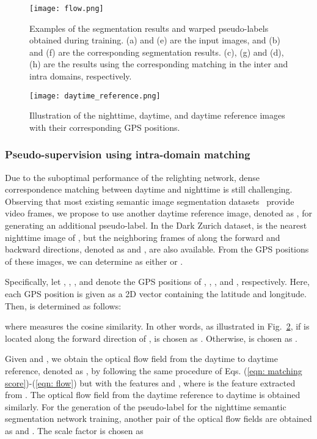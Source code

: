 \documentclass[10pt,twocolumn,letterpaper]{article}
\begin{document}
\begin{figure}[t]
  \centering
  \texttt{[image: flow.png]}
  \caption{Examples of the segmentation results and warped pseudo-labels obtained during training. (a) and (e) are the input images, and (b) and (f) are the corresponding segmentation results. 
(c), (g) and (d), (h) are the results using the corresponding matching in the inter and intra domains, respectively.}
  \label{fig:flow}
\end{figure}

\begin{figure}[t]
  \centering
  \texttt{[image: daytime\_reference.png]}
  \caption{Illustration of the nighttime, daytime, and daytime reference images with their corresponding GPS positions. }
  \label{fig:gps_data}
\end{figure}

\subsubsection{Pseudo-supervision using intra-domain matching}
Due to the suboptimal performance of the relighting network, dense correspondence matching between daytime and nighttime is still challenging. Observing that most existing semantic image segmentation datasets~\cite{Cordts2016Cityscapes,Geiger2013kitti,sakaridis2020map-guided} provide video frames, we propose to use another daytime reference image, denoted as , for generating an additional pseudo-label. In the Dark Zurich dataset,  is the nearest nighttime image of , but the neighboring frames of  along the forward and backward directions, denoted as  and , are also available. From the GPS positions of these images, we can determine  as either  or . 

Specifically, let , , , and  denote the GPS positions of , , , and , respectively. Here, each GPS position is given as a 2D vector containing the latitude and longitude. Then,  is determined as follows:

where  measures the cosine similarity. In other words, as illustrated in Fig.~\ref{fig:gps_data}, if  is located along the forward direction of ,  is chosen as . Otherwise,  is chosen as .

Given  and , we obtain the optical flow field from the daytime to daytime reference, denoted as , by following the same procedure of Eqs. (\ref{eqn: matching score})-(\ref{eqn: flow}) but with the features  and , where  is the feature extracted from . The optical flow field from the daytime reference to daytime  is obtained similarly. For the generation of the pseudo-label for the nighttime semantic segmentation network training, another pair of the optical flow fields are obtained as  and . The scale factor  is chosen as
\end{document}
